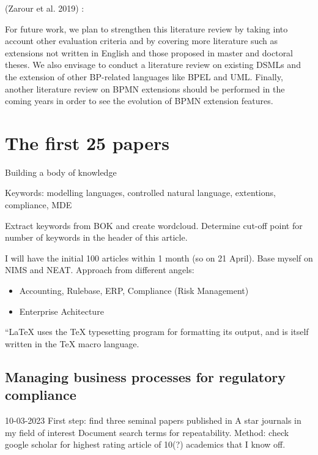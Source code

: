 \documentclass[
  letterpaper,
  DIV=11,
  numbers=noendperiod]{scrreprt}
\providecommand{\tightlist}{%
  \setlength{\itemsep}{0pt}\setlength{\parskip}{0pt}}\usepackage{longtable,booktabs,array}
\begin{document}
(Zarour et al. 2019) :

For future work, we plan to strengthen this literature review by taking
into account other evaluation criteria and by covering more literature
such as extensions not written in English and those proposed in master
and doctoral theses. We also envisage to conduct a literature review on
existing DSMLs and the extension of other BP-related languages like BPEL
and UML. Finally, another literature review on BPMN extensions should be
performed in the coming years in order to see the evolution of BPMN
extension features.

\hypertarget{the-first-25-papers}{%
\chapter{The first 25 papers}\label{the-first-25-papers}}

Building a body of knowledge

\hfill\break

Keywords: modelling languages, controlled natural language, extentions,
compliance, MDE

Extract keywords from BOK and create wordcloud. Determine cut-off point
for number of keywords in the header of this article.

I will have the initial 100 articles within 1 month (so on 21 April).
Base myself on NIMS and NEAT. Approach from different angels:

\begin{itemize}
\tightlist
\item
  Accounting, Rulebase, ERP, Compliance (Risk Management)
\item
  Enterprise Achitecture
\end{itemize}

\newpage{}

\begin{center}
``\LaTeX{} uses the \TeX{} typesetting program for formatting
its output, and is itself written in the \TeX{} macro language.
\end{center}

\hypertarget{managing-business-processes-for-regulatory-compliance}{%
\section{Managing business processes for regulatory
compliance}\label{managing-business-processes-for-regulatory-compliance}}

10-03-2023 First step: find three seminal papers published in A star
journals in my field of interest Document search terms for
repeatability. Method: check google scholar for highest rating article
of 10(?) academics that I know off.
\end{document}
